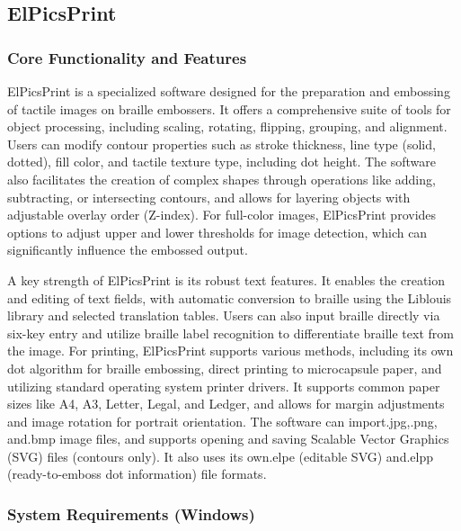 \subsection{ElPicsPrint}

\subsubsection{Core Functionality and Features}

ElPicsPrint is a specialized software designed for the preparation and embossing of tactile images on braille embossers.\cite{TactileViewIrie} It offers a comprehensive suite of tools for object processing, including scaling, rotating, flipping, grouping, and alignment.\cite{TactileViewIrie} Users can modify contour properties such as stroke thickness, line type (solid, dotted), fill color, and tactile texture type, including dot height.\cite{TactileViewIrie} The software also facilitates the creation of complex shapes through operations like adding, subtracting, or intersecting contours, and allows for layering objects with adjustable overlay order (Z-index).\cite{TactileViewIrie} For full-color images, ElPicsPrint provides options to adjust upper and lower thresholds for image detection, which can significantly influence the embossed output.\cite{TactileViewIrie}

A key strength of ElPicsPrint is its robust text features. It enables the creation and editing of text fields, with automatic conversion to braille using the Liblouis library and selected translation tables.\cite{TactileViewIrie} Users can also input braille directly via six-key entry and utilize braille label recognition to differentiate braille text from the image.\cite{TactileViewIrie} For printing, ElPicsPrint supports various methods, including its own dot algorithm for braille embossing, direct printing to microcapsule paper, and utilizing standard operating system printer drivers.\cite{TactileViewIrie} It supports common paper sizes like A4, A3, Letter, Legal, and Ledger, and allows for margin adjustments and image rotation for portrait orientation.\cite{TactileViewIrie} The software can import.jpg,.png, and.bmp image files, and supports opening and saving Scalable Vector Graphics (SVG) files (contours only).\cite{TactileViewIrie} It also uses its own.elpe (editable SVG) and.elpp (ready-to-emboss dot information) file formats.\cite{DuxburyDetails}

\subsubsection{System Requirements (Windows)}

